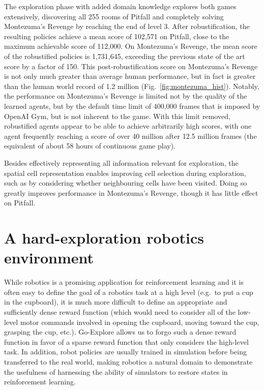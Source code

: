 \documentclass{nature}
\renewcommand*{\cite}[1]{\supercite{#1}}
\begin{document}
The exploration phase with added domain knowledge explores both games extensively, discovering all 255 rooms of Pitfall and completely solving Montezuma's Revenge by reaching the end of level 3.
After robustification, the resulting policies achieve a mean score of 102,571 on Pitfall, close to the maximum achievable score of 112,000. 
On Montezuma's Revenge, the mean score of the robustified policies is 1,731,645, 
exceeding the previous state of the art score by a factor of 150.
This post-robustification score on Montezuma's Revenge is not only much greater than average human performance, but in fact is greater than the human world record of 1.2 million\cite{atari_scoreboard} (Fig.~\ref{fig:montezuma_hist}).
Notably, the performance on Montezuma's Revenge is limited not by the quality of the learned agents, but by the default time limit of 400,000 frames that is imposed by OpenAI Gym, but is not inherent to the game.
With this limit removed, robustified agents appear to be able to achieve
arbitrarily high scores, with one agent frequently reaching a score
of over 40 million after 12.5 million frames (the equivalent of about 58 hours of continuous game play).

Besides effectively representing all information relevant for exploration, the spatial cell representation enables improving cell selection during exploration, such as by considering whether neighbouring cells have been visited. Doing so greatly improves performance in Montezuma's Revenge, though it has little effect on Pitfall.

\section*{A hard-exploration robotics environment}
\label{sec:robotics}

While robotics is a promising application for reinforcement learning and
it is often easy to define the goal of a robotics task at a high level (e.g.\ to put a cup in the cupboard), it is much more difficult to define an appropriate and sufficiently dense reward function (which would need to consider all of the low-level motor commands involved in opening the cupboard, moving toward the cup, grasping the cup, etc.).
Go-Explore allows us to forgo such a dense reward function in favor of a sparse reward function that only considers the high-level task.
In addition, robot policies are usually trained in simulation before being transferred to the real world\cite{cully2015robots,andrychowicz2020learning,peng2018sim,tan2018sim}, making robotics a natural domain to demonstrate the usefulness of harnessing the ability of simulators to restore states in reinforcement learning.
\end{document}
